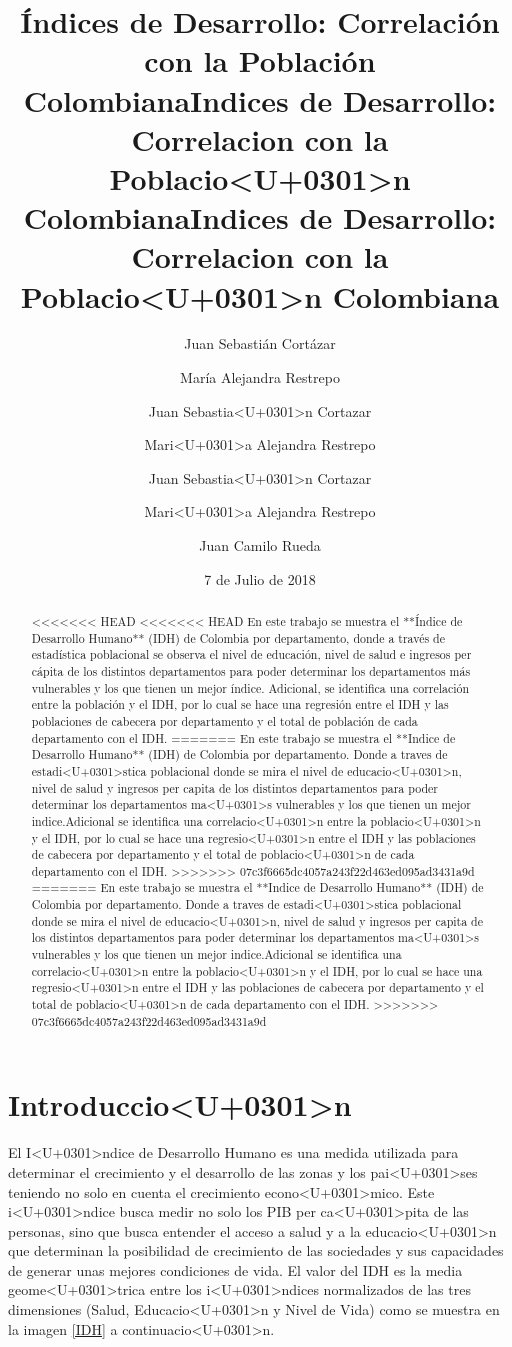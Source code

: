 \documentclass{article}
\title{Índices de Desarrollo: Correlación con la Población Colombiana}
\author[1]{\normalsize Juan Sebastián Cortázar}
\author[2]{\normalsize María Alejandra Restrepo}
\title{Indices de Desarrollo: Correlacion con la Poblacio<U+0301>n Colombiana}
\author[1]{\normalsize Juan Sebastia<U+0301>n Cortazar}
\author[2]{\normalsize Mari<U+0301>a Alejandra Restrepo}
\title{Indices de Desarrollo: Correlacion con la Poblacio<U+0301>n Colombiana}
\author[1]{\normalsize Juan Sebastia<U+0301>n Cortazar}
\author[2]{\normalsize Mari<U+0301>a Alejandra Restrepo}
\author[3]{\normalsize Juan Camilo Rueda}
\affil[1,2,3]{\small  Universidad de los Andes\\
\texttt{{js.cortazar533,ma.restrepot,jc.rueda169}@uniandes.edu.col}}
\date{7 de Julio de 2018}
\begin{document}


\maketitle


\begin{abstract}
<<<<<<< HEAD
<<<<<<< HEAD
En este trabajo se muestra el **Índice de Desarrollo Humano** (IDH) de Colombia por departamento, donde a través de estadística poblacional se observa el nivel de educación, nivel de salud e ingresos per cápita de los distintos departamentos para poder determinar los departamentos más vulnerables y los que tienen un mejor índice. Adicional, se identifica una correlación entre la población y el IDH, por lo cual se hace una regresión entre el IDH y las poblaciones de cabecera por departamento y el total de población de cada departamento con el IDH.
=======
En este trabajo se muestra el **Indice de Desarrollo Humano** (IDH) de Colombia por departamento. Donde a traves de estadi<U+0301>stica poblacional donde se mira el nivel de educacio<U+0301>n, nivel de salud y ingresos per capita de los distintos departamentos para poder determinar los departamentos ma<U+0301>s vulnerables y los que tienen un mejor indice.Adicional se identifica una correlacio<U+0301>n entre la poblacio<U+0301>n y el IDH, por lo cual se hace una regresio<U+0301>n entre el IDH y las poblaciones de cabecera por departamento y el total de poblacio<U+0301>n de cada departamento con el IDH. 
>>>>>>> 07c3f6665dc4057a243f22d463ed095ad3431a9d
=======
En este trabajo se muestra el **Indice de Desarrollo Humano** (IDH) de Colombia por departamento. Donde a traves de estadi<U+0301>stica poblacional donde se mira el nivel de educacio<U+0301>n, nivel de salud y ingresos per capita de los distintos departamentos para poder determinar los departamentos ma<U+0301>s vulnerables y los que tienen un mejor indice.Adicional se identifica una correlacio<U+0301>n entre la poblacio<U+0301>n y el IDH, por lo cual se hace una regresio<U+0301>n entre el IDH y las poblaciones de cabecera por departamento y el total de poblacio<U+0301>n de cada departamento con el IDH. 
>>>>>>> 07c3f6665dc4057a243f22d463ed095ad3431a9d
\end{abstract}

\section*{Introduccio<U+0301>n}

El I<U+0301>ndice de Desarrollo Humano es una medida utilizada para determinar el crecimiento y el desarrollo de las zonas y los pai<U+0301>ses teniendo no solo en cuenta el crecimiento econo<U+0301>mico. Este i<U+0301>ndice busca medir no solo los PIB per ca<U+0301>pita de las personas, sino que busca entender el acceso a salud y a la educacio<U+0301>n que determinan la posibilidad de crecimiento de las sociedades y sus capacidades de generar unas mejores condiciones de vida. 
El valor del IDH es la media geome<U+0301>trica entre los i<U+0301>ndices normalizados de las tres dimensiones (Salud, Educacio<U+0301>n y Nivel de Vida) como se muestra en la imagen \ref{IDH} a continuacio<U+0301>n. 
\end{document}
